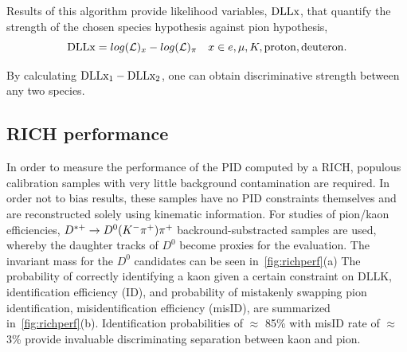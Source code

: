 Results of this algorithm provide likelihood variables, $\rm{\textrm{DLL{x}}}$, that quantify the strength of the chosen species hypothesis against pion hypothesis,
\begin{equation}
	\textrm{\textrm{DLL{x}}} = log(\mathcal{L})_{x} - log(\mathcal{L})_{\pi} \quad  x\in{e, \mu, K, \rm{proton, deuteron}}.
\end{equation}

By calculating $\rm{DLL{x_{1}} - DLL{x_{2}}}$, one can obtain discriminative strength between any two species.

\subsection{RICH performance }
\label{RICHperf}
In order to measure the performance of the \Gls{PID} computed by a \gls{RICH}, populous calibration samples with very little background contamination are required. In order not to bias results, these samples have no \Gls{PID} constraints themselves and are reconstructed solely using kinematic information. For studies of pion/kaon efficiencies, $D^{*+} \rightarrow D^{0}({K}^{-}{{\pi}^+}){{\pi}^+}$ backround-substracted samples are used, whereby the daughter tracks of $D^{0}$ become proxies for the evaluation. The invariant mass for the $D^{0}$ candidates can be seen in~\autoref{fig:richperf}(a) The probability of correctly identifying a kaon given a certain constraint on $\textrm{DLL{K}}$, identification efficiency (\Gls{ID}), and probability of mistakenly swapping pion identification, misidentification efficiency (\gls{misID}), are summarized in~\autoref{fig:richperf}(b). Identification probabilities of $\approx$ 85\% with misID rate of $\approx$ 3\% provide invaluable discriminating separation between kaon and pion.




